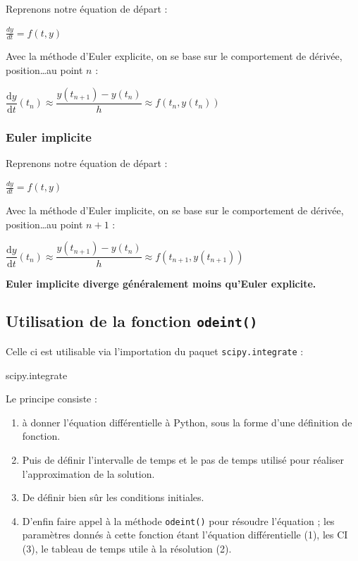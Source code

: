 \documentclass[11pt]{article}
\begin{document}
Reprenons notre équation de départ : 

$\frac{dy}{dt} = f(t,y)$

Avec la méthode d'Euler explicite, on se base sur le comportement de dérivée, position\ldots au point $n$ : 

$\dfrac{\text{d}y}{\text{d}t}(t_n) \approx \dfrac{y(t_{n+1}) - y(t_n)}{h} \approx f(t_n , y(t_n))$




\subsubsection{Euler implicite}


Reprenons notre équation de départ : 

$\frac{dy}{dt} = f(t,y)$

Avec la méthode d'Euler implicite, on se base sur le comportement de dérivée, position\ldots au point $n+1$ : 

$\dfrac{\text{d}y}{\text{d}t}(t_n) \approx \dfrac{y(t_{n+1}) - y(t_n)}{h} \approx f(t_{n+1} , y(t_{n+1}))$




\begin{center}
\textbf{Euler implicite diverge généralement moins qu'Euler explicite.}                                                                       \end{center}







\subsection{Utilisation de la fonction \texttt{odeint()}}


Celle ci est utilisable via l'importation du paquet \texttt{scipy.integrate} : 

\from scipy.integrate 


Le principe consiste  : 
\begin{enumerate}


\item à donner l'équation différentielle à Python, sous la forme d'une définition de fonction.

\item Puis de définir l'intervalle de temps et le pas de temps utilisé pour réaliser l'approximation de la solution.

\item De définir bien sûr les conditions initiales.

\item D'enfin faire appel à la méthode \texttt{odeint()} pour résoudre l'équation ; les paramètres donnés à cette fonction étant l'équation différentielle (1), les CI (3), le tableau de temps utile à la résolution (2).

\end{enumerate}
\end{document}
